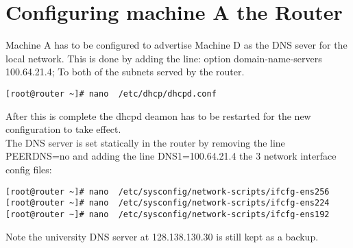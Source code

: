 \documentclass[11pt,onside]{article}
\begin{document}
\section{Configuring machine A the Router}
Machine A has to be configured to advertise Machine D as the DNS sever for the local network. This is done by adding the line:   option domain-name-servers 100.64.21.4;
To both of the subnets served by the router.
\begin{lstlisting}
[root@router ~]# nano  /etc/dhcp/dhcpd.conf
\end{lstlisting}
After this is complete the dhcpd deamon has to be restarted for the new configuration to take effect. \\
The DNS server is set statically in the router by removing the line PEERDNS=no and adding the line DNS1=100.64.21.4 the 3 network interface config files:
\begin{lstlisting}
[root@router ~]# nano  /etc/sysconfig/network-scripts/ifcfg-ens256
[root@router ~]# nano  /etc/sysconfig/network-scripts/ifcfg-ens224
[root@router ~]# nano  /etc/sysconfig/network-scripts/ifcfg-ens192
\end{lstlisting}
Note the university DNS server at 128.138.130.30 is still kept as a backup.
\end{document}
